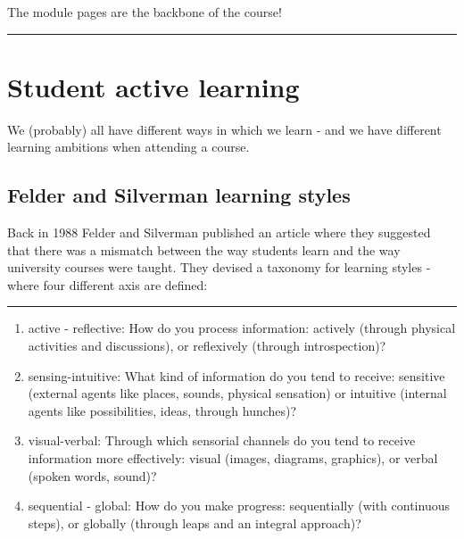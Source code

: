 \documentclass[]{article}
\providecommand{\tightlist}{%
  \setlength{\itemsep}{0pt}\setlength{\parskip}{0pt}}
\begin{document}
The module pages are the backbone of the course!

\begin{center}\rule{0.5\linewidth}{\linethickness}\end{center}

\hypertarget{student-active-learning}{%
\section{Student active learning}\label{student-active-learning}}

We (probably) all have different ways in which we learn - and we have
different learning ambitions when attending a course.

\hypertarget{felder-and-silverman-learning-styles}{%
\subsection{Felder and Silverman learning
styles}\label{felder-and-silverman-learning-styles}}

Back in 1988 Felder and Silverman published an article where they
suggested that there was a mismatch between the way students learn and
the way university courses were taught. They devised a taxonomy for
learning styles - where four different axis are defined:

\begin{center}\rule{0.5\linewidth}{\linethickness}\end{center}

\begin{enumerate}
\def\labelenumi{\arabic{enumi})}
\tightlist
\item
  active - reflective: How do you process information: actively (through
  physical activities and discussions), or reflexively (through
  introspection)?
\item
  sensing-intuitive: What kind of information do you tend to receive:
  sensitive (external agents like places, sounds, physical sensation) or
  intuitive (internal agents like possibilities, ideas, through
  hunches)?
\item
  visual-verbal: Through which sensorial channels do you tend to receive
  information more effectively: visual (images, diagrams, graphics), or
  verbal (spoken words, sound)?
\item
  sequential - global: How do you make progress: sequentially (with
  continuous steps), or globally (through leaps and an integral
  approach)?
\end{enumerate}
\end{document}
